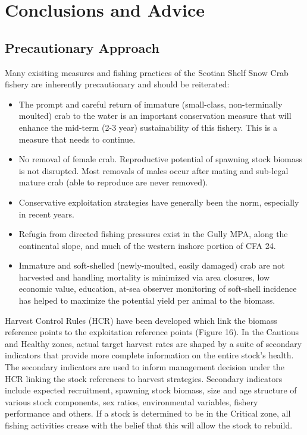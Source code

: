 \documentclass[paper=a4, fontsize=11pt]{article}
\begin{document}
\section{Conclusions and Advice}
\subsection{Precautionary Approach}
Many exisiting measures and fishing practices of the Scotian Shelf Snow Crab fishery are inherently precautionary and should be reiterated:
\begin{itemize}
  \item The prompt and careful return of immature (small-class, non-terminally moulted) crab to the water is an important conservation measure that will enhance the mid-term (2-3 year) sustainability of this fishery. This is a measure that needs to continue.
  \item No removal of female crab. Reproductive potential of spawning stock biomass is not disrupted. Most removals of males occur after mating and sub-legal mature crab (able to reproduce are never removed).
  \item Conservative exploitation strategies have generally been the norm, especially in recent years. 
  \item Refugia from directed fishing pressures exist in the Gully MPA, along the continental slope, and much of the western inshore portion of CFA 24.\
  \item Immature and soft-shelled (newly-moulted, easily damaged) crab are not harvested and handling mortality is minimized via area closures, low economic value, education, at-sea observer monitoring of soft-shell incidence has helped to maximize the potential yield per animal to the biomass. \\
 \end{itemize} 

Harvest Control Rules (HCR) have been developed which link the biomass reference points to the exploitation reference points (Figure 16). In the Cautious and Healthy zones, actual target harvest rates are shaped by a suite of secondary indicators that provide more complete information on the entire stock's health. The secondary indicators are used to inform management decision under the HCR linking the stock references to harvest strategies. Secondary indicators include expected recruitment, spawning stock biomass, size and age structure of various stock components, sex ratios, environmental variables, fishery performance and others. If a stock is determined to be in the Critical zone, all fishing activities crease with the belief that this will allow the stock to rebuild. \\
\end{document}
